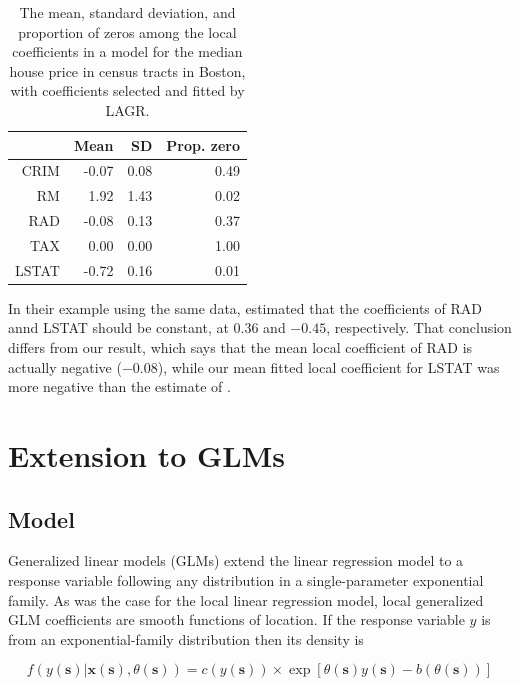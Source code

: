 \documentclass[12pt,english,authoryear, review]{article}\usepackage[]{graphicx}\usepackage[]{color}
\theoremstyle{plain}
\theoremstyle{plain}
\begin{document}
\begin{table}
\centering
\begin{tabular}{rrrr}
  & Mean & SD & Prop. zero \\ 
  \hline
CRIM & -0.07 & 0.08 & 0.49 \\ 
  RM & 1.92 & 1.43 & 0.02 \\ 
  RAD & -0.08 & 0.13 & 0.37 \\ 
  TAX & 0.00 & 0.00 & 1.00 \\ 
  LSTAT & -0.72 & 0.16 & 0.01 \\ 
  \end{tabular}
\caption{The mean, standard deviation, and proportion of zeros among the local coefficients in a model for the median house price in census tracts in Boston, with coefficients selected and fitted by LAGR.} 
\label{tab:boston-coefs-lagr}
\end{table}


In their example using the same data, \citet{Sun-Yan-Zhang-Lu-2014}
estimated that the coefficients of RAD annd LSTAT should be constant,
at $0.36$ and $-0.45$, respectively. That conclusion differs from
our result, which says that the mean local coefficient of RAD is actually
negative (\ensuremath{-0.08}), while
our mean fitted local coefficient for LSTAT was more negative than
the estimate of \citet{Sun-Yan-Zhang-Lu-2014}.


\section{Extension to GLMs\label{sec:lagr-gllm}}


\subsection{Model}

Generalized linear models (GLMs) extend the linear regression model
to a response variable following any distribution in a single-parameter
exponential family. As was the case for the local linear regression
model, local generalized GLM coefficients are smooth functions of
location. If the response variable $y$ is from an exponential-family
distribution then its density is 

\[
f\left(y\left(\bm{s}\right)|\bm{x}\left(\bm{s}\right),\theta\left(\bm{s}\right)\right)=c\left(y\left(\bm{s}\right)\right)\times\exp\left[\theta\left(\bm{s}\right)y\left(\bm{s}\right)-b\left(\theta\left(\bm{s}\right)\right)\right]
\]
\end{document}
